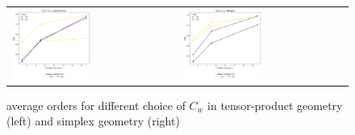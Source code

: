 \begin{figure}[h!]
	\centering
	\begin{tabular}{p{} p{}}
		\vspace{0pt} 
		\includegraphics[width=0.49\textwidth]{../figs/parametric/burgers_2D/orders_2_4}
		&
		\vspace{0pt} 
		\includegraphics[width=0.49\textwidth]{../figs/parametric/burgers_2D/orders_2_3}
	\end{tabular}
	\caption{ average orders for different choice of $C_w$ in 
	tensor-product geometry (left) and simplex geometry (right)}
	\label{fig:kucera_orders}
\end{figure}


